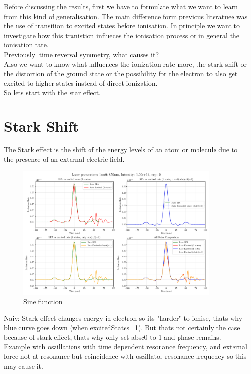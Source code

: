 Before discussing the results, first we have to formulate what we want to learn from this kind of generalisation. 
The main difference form previous literatuee was the use of transition to excited states before ionisation. 
In principle we want to investigate how this tranistion influeces the ionisation process or in general the ionisation rate.\\
Previously: time reversal symmetry, what causes it? \\
Also we want to know what influences the ionization rate more, the stark shift or the distortion of the ground state or the possibility for the electron to also get excited to higher states instead of direct ionization.\\
So lets start with the star effect.
\section{Stark Shift}
The Stark effect is the shift of the energy levels of an atom or molecule due to the presence of an external electric field.

\begin{figure}[H]
    \centering
    \includegraphics[width=0.9\textwidth]{figures/rate4_850_1.00e+14_onlystark.pdf}
    \caption{Sine function}
    \label{fig:starkeffect}
\end{figure}

Naiv: Stark effect changes energy in electron so its "harder" to ionise, thats why blue curve goes down (when excitedStates=1). 
But thats not certainly the case because of stark effect, thats why only set absc0 to 1 and phase remains. 
Example with oszillations with time dependent resonance frequency, and external force not at resonance but coincidence with oszillator resonance frequency so this may cause it.







